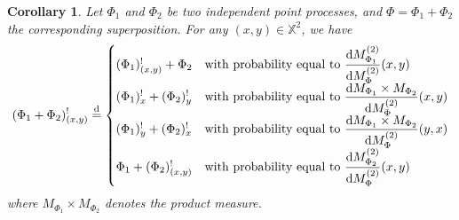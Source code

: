 \documentclass[11pt,a4paper,oneside]{article}
\newcommand{\deq}{\stackrel{\mbox{\scriptsize d}}{=}}
\newcommand{\dd}{\mathrm d}
\newcommand{\X}{\mathbb{X}}
\newtheorem{corollary}{Corollary}
\theoremstyle{definition}
\theoremstyle{remark}
\begin{document}
\begin{corollary}
Let $\Phi_1$ and $\Phi_2$ be two independent point processes, and $\Phi= \Phi_1+\Phi_2$ the corresponding superposition. For any $(x, y) \in \X^2$, we have
    \[
    (\Phi_1 + \Phi_2)^!_{(x, y)} \deq \begin{cases}
        (\Phi_1)^!_{(x, y)} + \Phi_2 &\text{with probability equal to } \displaystyle{\frac{ \dd M_{\Phi_1}^{(2)}}{\dd M_{\Phi}^{(2)} } (x,y)}\\
        (\Phi_1)^!_{x} +  (\Phi_2)^!_{y} &\text{with probability equal to }  \displaystyle{\frac{\dd M_{\Phi_{1}}  \times M_{\Phi_{2}}}{\dd M_{\Phi}^{(2)} } (x,y)}\\
       (\Phi_1)^!_{y} +  (\Phi_2)^!_{x} &\text{with probability equal to }   \displaystyle{\frac{\dd M_{\Phi_{1}} \times M_{\Phi_{2}}}{\dd M_{\Phi}^{(2)} } (y,x)}\\
        \Phi_1+ (\Phi_2)^!_{(x, y)} &\text{with probability equal to }  \displaystyle{\frac{\dd M_{\Phi_2}^{(2)}}{\dd M_{\Phi}^{(2)} } (x,y) }\\
    \end{cases}
    \]
    where $M_{\Phi_1} \times M_{\Phi_2}$ denotes the product measure.
\end{corollary}
\end{document}
